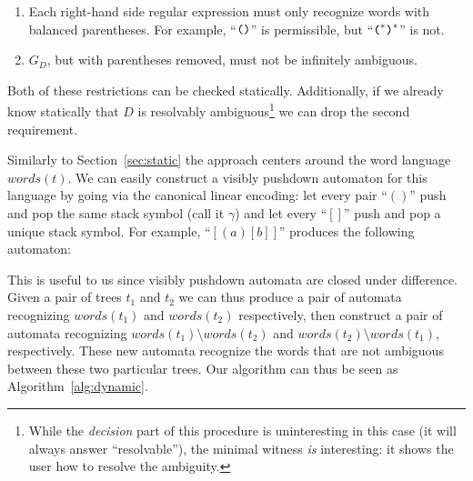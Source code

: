 \documentclass[runningheads]{llncs}
\newcommand{\words}{\mathit{words}} %
\newcommand{\reqpl}{(}
\newcommand{\reqpr}{)}
\newcommand{\reqp}[1]{\reqpl#1\reqpr}
\newcommand{\pospl}{[}
\newcommand{\pospr}{]}
\newcommand{\posp}[1]{\pospl#1\pospr}
\begin{document}
\begin{enumerate}
\item Each right-hand side regular expression must only recognize words with balanced parentheses. For example, ``$\verb|(| \verb|)|$'' is permissible, but ``$\verb|(|^{*} \verb|)|^{*}$'' is not.
\item $G_D$, but with parentheses removed, must not be infinitely ambiguous.
\end{enumerate}

\noindent Both of these restrictions can be checked statically. Additionally, if we already know statically that $D$ is resolvably ambiguous\footnote{While the \emph{decision} part of this procedure is uninteresting in this case (it will always answer ``resolvable''), the minimal witness \emph{is} interesting: it shows the user how to resolve the ambiguity.} we can drop the second requirement.

Similarly to Section~\ref{sec:static} the approach centers around the word language $\words(t)$. We can easily construct a visibly pushdown automaton for this language by going via the canonical linear encoding: let every pair ``$\reqp{}$'' push and pop the same stack symbol (call it $\gamma$) and let every ``$\posp{}$'' push and pop a unique stack symbol. For example, ``$\posp{\reqp{a}\posp{b}}$'' produces the following automaton:

\begin{center}
\end{center}

\noindent This is useful to us since visibly pushdown automata are closed under difference. Given a pair of trees $t_1$ and $t_2$ we can thus produce a pair of automata recognizing $\words(t_1)$ and $\words(t_2)$ respectively, then construct a pair of automata recognizing $\words(t_1) \setminus \words(t_2)$ and $\words(t_2) \setminus \words(t_1)$, respectively. These new automata recognize the words that are not ambiguous between these two particular trees. Our algorithm can thus be seen as Algorithm~\ref{alg:dynamic}.
\end{document}
